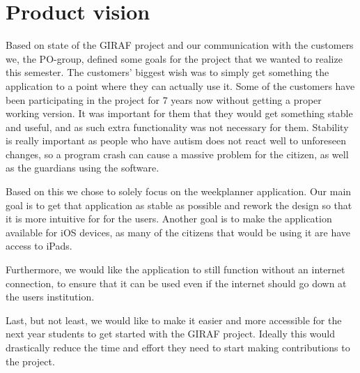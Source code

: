 \section{Product vision}
Based on state of the GIRAF project and our communication with the customers we, the PO-group, defined some goals for the project that we wanted to realize this semester.
The customers' biggest wish was to simply get something the application to a point where they can actually use it.
Some of the customers have been participating in the project for 7 years now without getting a proper working version.
It was important for them that they would get something stable and useful, and as such extra functionality was not necessary for them.
Stability is really important as people who have autism does not react well to unforeseen changes, so a program crash can cause a massive problem for the citizen, as well as the guardians using the software.

Based on this we chose to solely focus on the weekplanner application.
Our main goal is to get that application as stable as possible and rework the design so that it is more intuitive for for the users.
Another goal is to make the application available for iOS devices, as many of the citizens that would be using it are have access to iPads.

Furthermore, we would like the application to still function without an internet connection, to ensure that it can be used even if the internet should go down at the users institution.

Last, but not least, we would like to make it easier and more accessible for the next year students to get started with the GIRAF project.
Ideally this would drastically reduce the time and effort they need to start making contributions to the project.